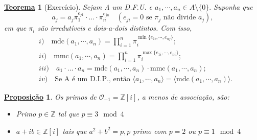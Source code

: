 \documentclass{article}
\newtheorem*{theorem*}{\underline{Teorema}}
\newtheorem*{prop*}{\underline{Proposi\c c\~ao}}
\begin{document}
\begin{theorem*}[Exercício]
  Sejam A um D.F.U. e \(a_{1}, \cdots, a_{n}\in A\setminus{\{0\}}.\) Suponha que 
  \[
    a_{j} = a_{j}\pi_{1}^{e_{j1}}\cdot\dotsc \cdot \pi_{n}^{e_{jn}} \quad (e_{ji} = 0 \text{ se } \pi_{j} \text{ não divide } a_{j}),
  \]
  em que \(\pi_{i}\) são irredutíveis e dois-a-dois distintos. Com isso, 
  \begin{align*}
    &i)\quad\mathrm{mdc}(a_{1},\cdots,a_{n}) = \prod\limits_{i=1}^{n}\pi_{i}^{\min\{e_{1i}, \cdots, e_{nj}\}};\\
    &ii)\quad \mathrm{mmc}(a_{1}, \cdots, a_{n}) = \prod\limits_{i=1}^{n}\pi_{i}^{\max\{e_{1i}, \cdots, e_{ni}\}};\\
    &iii)\quad a_{1}\cdot \dotsc \cdot  a_{n} = \mathrm{mdc}(a_{1}, \cdots, a_{n})\cdot \mathrm{mmc}(a_{1}, \cdots, a_{n});\\
    &iv)\quad \text{Se A é um D.I.P., então }  \langle a_{1}, \cdots, a_{n} \rangle = \langle \mathrm{mdc}(a_{1}, \cdots, a_{n}) \rangle.
  \end{align*}
\end{theorem*}
\begin{prop*}
  Os primos de \(\mathcal{O}_{-1} = \mathbb{Z}[i]\), a menos de associação, são:
  \begin{itemize}
    \item[1)] Primo \(p\in \mathbb{Z}\) tal que \(p\equiv 3 \mod 4\)
    \item[2)] \(a+ib\in \mathbb{Z}[i]\) tais que \(a^{2} + b^{2} = p, p\) primo com \(p = 2\) ou \(p\equiv 1 \mod 4\)
  \end{itemize}
\end{prop*}
\end{document}
